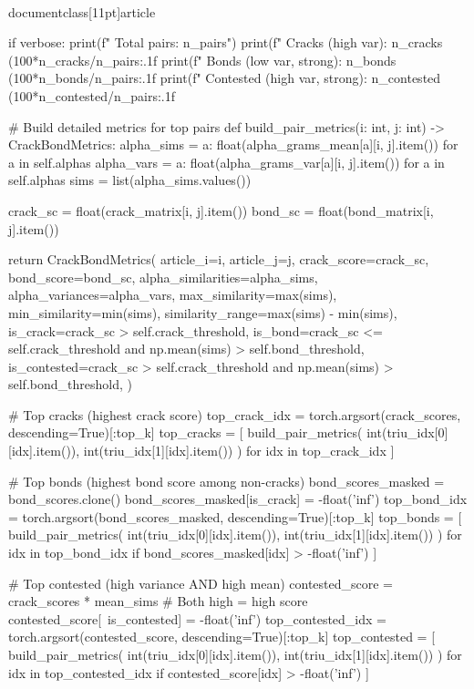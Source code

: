 \\documentclass[11pt]{article}
\begin{document}
\begin{CodeBlock}
{{{{{{{{        if verbose:
            print(f"  Total pairs: {n_pairs}")
            print(f"  Cracks (high var): {n_cracks} ({100*n_cracks/n_pairs:.1f}%
            print(f"  Bonds (low var, strong): {n_bonds} ({100*n_bonds/n_pairs:.1f}%
            print(f"  Contested (high var, strong): {n_contested} ({100*n_contested/n_pairs:.1f}%
        
        # Build detailed metrics for top pairs
        def build_pair_metrics(i: int, j: int) -> CrackBondMetrics:
            alpha_sims = {a: float(alpha_grams_mean[a][i, j].item()) for a in self.alphas}
            alpha_vars = {a: float(alpha_grams_var[a][i, j].item()) for a in self.alphas}
            sims = list(alpha_sims.values())
            
            crack_sc = float(crack_matrix[i, j].item())
            bond_sc = float(bond_matrix[i, j].item())
            
            return CrackBondMetrics(
                article_i=i,
                article_j=j,
                crack_score=crack_sc,
                bond_score=bond_sc,
                alpha_similarities=alpha_sims,
                alpha_variances=alpha_vars,
                max_similarity=max(sims),
                min_similarity=min(sims),
                similarity_range=max(sims) - min(sims),
                is_crack=crack_sc > self.crack_threshold,
                is_bond=crack_sc <= self.crack_threshold and np.mean(sims) > self.bond_threshold,
                is_contested=crack_sc > self.crack_threshold and np.mean(sims) > self.bond_threshold,
            )
        
        # Top cracks (highest crack score)
        top_crack_idx = torch.argsort(crack_scores, descending=True)[:top_k]
        top_cracks = [
            build_pair_metrics(
                int(triu_idx[0][idx].item()),
                int(triu_idx[1][idx].item())
            )
            for idx in top_crack_idx
        ]
        
        # Top bonds (highest bond score among non-cracks)
        bond_scores_masked = bond_scores.clone()
        bond_scores_masked[is_crack] = -float('inf')
        top_bond_idx = torch.argsort(bond_scores_masked, descending=True)[:top_k]
        top_bonds = [
            build_pair_metrics(
                int(triu_idx[0][idx].item()),
                int(triu_idx[1][idx].item())
            )
            for idx in top_bond_idx
            if bond_scores_masked[idx] > -float('inf')
        ]
        
        # Top contested (high variance AND high mean)
        contested_score = crack_scores * mean_sims  # Both high = high score
        contested_score[~is_contested] = -float('inf')
        top_contested_idx = torch.argsort(contested_score, descending=True)[:top_k]
        top_contested = [
            build_pair_metrics(
                int(triu_idx[0][idx].item()),
                int(triu_idx[1][idx].item())
            )
            for idx in top_contested_idx
            if contested_score[idx] > -float('inf')
        ]
        
}}}}}}}}
\end{CodeBlock}
\end{document}
